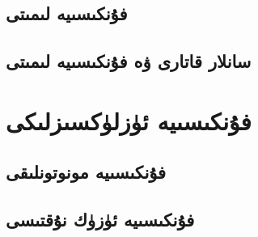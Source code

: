 \subsection{فۇنكىسىيە لىمىتى}
\subsection{سانلار قاتارى ۋە فۇنكىسىيە لىمىتى}

\section{فۇنكىسىيە ئۈزلۈكسىزلىكى}
\subsection{فۇنكىسىيە مونوتونلىقى}
\subsection{فۇنكىسىيە ئۈزۈك نۇقتىسى}
